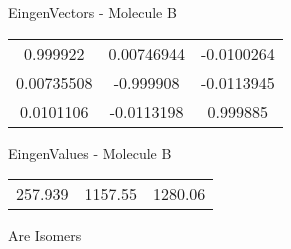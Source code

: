 \begin{multicols}{2}
\begin{center}
\vtab
 EingenVectors - Molecule B     \\
\vtab
\begin{tabular}{|c c c|}
0.999922	 & 	0.00746944	 & 	-0.0100264	 \\
0.00735508	 & 	-0.999908	 & 	-0.0113945	 \\
0.0101106	 & 	-0.0113198	 & 	0.999885
\end{tabular}

\vtab
 EingenValues - Molecule B     \\
\vtab
\begin{tabular}{|c c c|}
257.939	 & 	1157.55	 & 	1280.06
\end{tabular}

\end{center}
\end{multicols}
\begin{center}
\vtab
\vtab
\textcolor{NavyBlue}{\Large Are Isomers}
\end{center}
\newpage

